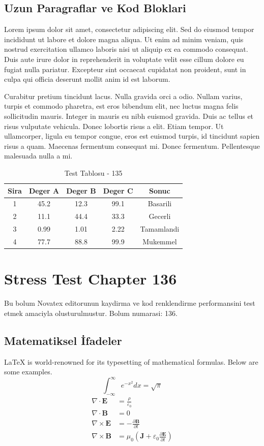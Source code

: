\documentclass[12pt,a4paper]{article}
\begin{document}
\subsection{Uzun Paragraflar ve Kod Bloklari}
Lorem ipsum dolor sit amet, consectetur adipiscing elit. Sed do eiusmod tempor incididunt ut labore et dolore magna aliqua. Ut enim ad minim veniam, quis nostrud exercitation ullamco laboris nisi ut aliquip ex ea commodo consequat. Duis aute irure dolor in reprehenderit in voluptate velit esse cillum dolore eu fugiat nulla pariatur. Excepteur sint occaecat cupidatat non proident, sunt in culpa qui officia deserunt mollit anim id est laborum.

Curabitur pretium tincidunt lacus. Nulla gravida orci a odio. Nullam varius, turpis et commodo pharetra, est eros bibendum elit, nec luctus magna felis sollicitudin mauris. Integer in mauris eu nibh euismod gravida. Duis ac tellus et risus vulputate vehicula. Donec lobortis risus a elit. Etiam tempor. Ut ullamcorper, ligula eu tempor congue, eros est euismod turpis, id tincidunt sapien risus a quam. Maecenas fermentum consequat mi. Donec fermentum. Pellentesque malesuada nulla a mi.

\begin{table}[h!]
\centering
\begin{tabular}{|c|c|c|c|c|}
\hline
\textbf{Sira} & \textbf{Deger A} & \textbf{Deger B} & \textbf{Deger C} & \textbf{Sonuc} \\
\hline
1 & 45.2 & 12.3 & 99.1 & Basarili \\
2 & 11.1 & 44.4 & 33.3 & Gecerli \\
3 & 0.99 & 1.01 & 2.22 & Tamamlandi \\
4 & 77.7 & 88.8 & 99.9 & Mukemmel \\
\hline
\end{tabular}
\caption{Test Tablosu - 135}
\end{table}

\newpage
\section{Stress Test Chapter 136}
Bu bolum Novatex editorunun kaydirma ve kod renklendirme performansini test etmek amaciyla olusturulmustur. Bolum numarasi: 136.

\subsection{Matematiksel İfadeler}
\LaTeX{} is world-renowned for its typesetting of mathematical formulas. Below are some examples.
\begin{equation}
\int_{-\infty}^{\infty} e^{-x^2} dx = \sqrt{\pi}
\end{equation}
\begin{align}
\nabla \cdot \mathbf{E} &= \frac{\rho}{\varepsilon_0} \\
\nabla \cdot \mathbf{B} &= 0 \\
\nabla \times \mathbf{E} &= -\frac{\partial \mathbf{B}}{\partial t} \\
\nabla \times \mathbf{B} &= \mu_0\left(\mathbf{J} + \varepsilon_0 \frac{\partial \mathbf{E}}{\partial t}\right)
\end{align}
\end{document}
